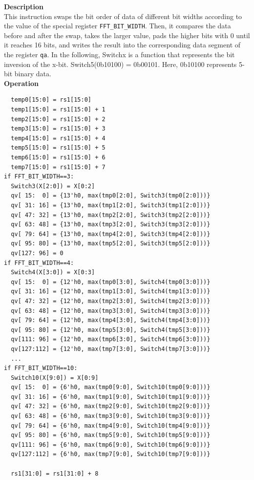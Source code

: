 \textbf{Description}\\
This instruction swaps the bit order of data of different bit widths according to the value of the special register \lstinline{FFT_BIT_WIDTH}. Then, it compares the data before and after the swap, takes the larger value, pads the higher bits with 0 until it reaches 16 bits, and writes the result into the corresponding data segment of the register \lstinline{qa}. In the following, Switchx is a function that represents the bit inversion of the x-bit. Switch5(0b10100) = 0b00101. Here, 0b10100 represents 5-bit binary data.\\
\textbf{Operation}
\begin{lstlisting}
  temp0[15:0] = rs1[15:0]
  temp1[15:0] = rs1[15:0] + 1
  temp2[15:0] = rs1[15:0] + 2
  temp3[15:0] = rs1[15:0] + 3
  temp4[15:0] = rs1[15:0] + 4
  temp5[15:0] = rs1[15:0] + 5
  temp6[15:0] = rs1[15:0] + 6
  temp7[15:0] = rs1[15:0] + 7
if FFT_BIT_WIDTH==3:
  Switch3(X[2:0]) = X[0:2]
  qv[ 15:  0] = {13'h0, max(tmp0[2:0], Switch3(tmp0[2:0]))}
  qv[ 31: 16] = {13'h0, max(tmp1[2:0], Switch3(tmp1[2:0]))}
  qv[ 47: 32] = {13'h0, max(tmp2[2:0], Switch3(tmp2[2:0]))}
  qv[ 63: 48] = {13'h0, max(tmp3[2:0], Switch3(tmp3[2:0]))}
  qv[ 79: 64] = {13'h0, max(tmp4[2:0], Switch3(tmp4[2:0]))}
  qv[ 95: 80] = {13'h0, max(tmp5[2:0], Switch3(tmp5[2:0]))}
  qv[127: 96] = 0
if FFT_BIT_WIDTH==4:
  Switch4(X[3:0]) = X[0:3]
  qv[ 15:  0] = {12'h0, max(tmp0[3:0], Switch4(tmp0[3:0]))}
  qv[ 31: 16] = {12'h0, max(tmp1[3:0], Switch4(tmp1[3:0]))}
  qv[ 47: 32] = {12'h0, max(tmp2[3:0], Switch4(tmp2[3:0]))}
  qv[ 63: 48] = {12'h0, max(tmp3[3:0], Switch4(tmp3[3:0]))}
  qv[ 79: 64] = {12'h0, max(tmp4[3:0], Switch4(tmp4[3:0]))}
  qv[ 95: 80] = {12'h0, max(tmp5[3:0], Switch4(tmp5[3:0]))}
  qv[111: 96] = {12'h0, max(tmp6[3:0], Switch4(tmp6[3:0]))}
  qv[127:112] = {12'h0, max(tmp7[3:0], Switch4(tmp7[3:0]))}
  ...
if FFT_BIT_WIDTH==10:
  Switch10(X[9:0]) = X[0:9]
  qv[ 15:  0] = {6'h0, max(tmp0[9:0], Switch10(tmp0[9:0]))}
  qv[ 31: 16] = {6'h0, max(tmp1[9:0], Switch10(tmp1[9:0]))}
  qv[ 47: 32] = {6'h0, max(tmp2[9:0], Switch10(tmp2[9:0]))}
  qv[ 63: 48] = {6'h0, max(tmp3[9:0], Switch10(tmp3[9:0]))}
  qv[ 79: 64] = {6'h0, max(tmp4[9:0], Switch10(tmp4[9:0]))}
  qv[ 95: 80] = {6'h0, max(tmp5[9:0], Switch10(tmp5[9:0]))}
  qv[111: 96] = {6'h0, max(tmp6[9:0], Switch10(tmp6[9:0]))}
  qv[127:112] = {6'h0, max(tmp7[9:0], Switch10(tmp7[9:0]))}

  rs1[31:0] = rs1[31:0] + 8
\end{lstlisting}


